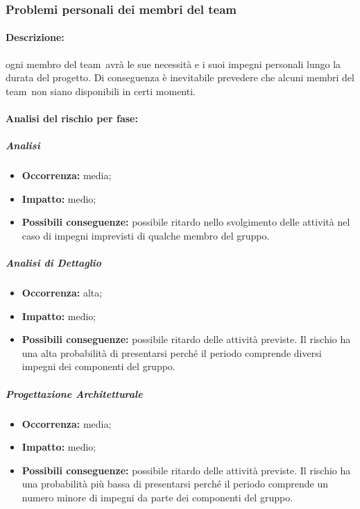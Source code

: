 \documentclass[../PianoProgetto.tex]{subfiles}
\begin{document}
\subsubsection{Problemi personali dei membri del team}
\label{sec:Problemi personali dei membri del team}

	\paragraph*{Descrizione:} ogni membro del team\g\ avrà le sue necessità e i suoi impegni personali lungo la durata del progetto. Di conseguenza è inevitabile prevedere che alcuni membri del team\g\ non siano disponibili in certi momenti.
	 
	\paragraph*{Analisi del rischio per fase:} 

		\subparagraph*{Analisi}
			\begin{itemize}[label={-}]
				\item \textbf{Occorrenza:} media;
				\item \textbf{Impatto:} medio;
				\item \textbf{Possibili conseguenze:} possibile ritardo nello svolgimento delle attività nel caso di impegni imprevisti di qualche membro del gruppo.
			\end{itemize}
			
		\subparagraph*{Analisi di Dettaglio}
			\begin{itemize}[label={-}]
				\item \textbf{Occorrenza:} alta;
				\item \textbf{Impatto:} medio;
				\item \textbf{Possibili conseguenze:} possibile ritardo delle attività previste. Il rischio ha una alta probabilità di presentarsi perché il periodo comprende diversi impegni dei componenti del gruppo.
			\end{itemize}
			
		\subparagraph*{Progettazione Architetturale}
			\begin{itemize}[label={-}]
				\item \textbf{Occorrenza:} media;
				\item \textbf{Impatto:} medio;
				\item \textbf{Possibili conseguenze:} possibile ritardo delle attività previste. Il rischio ha una probabilità più bassa di presentarsi perché il periodo comprende un numero minore di impegni da parte dei componenti del gruppo.
			\end{itemize}
			
\end{document}

